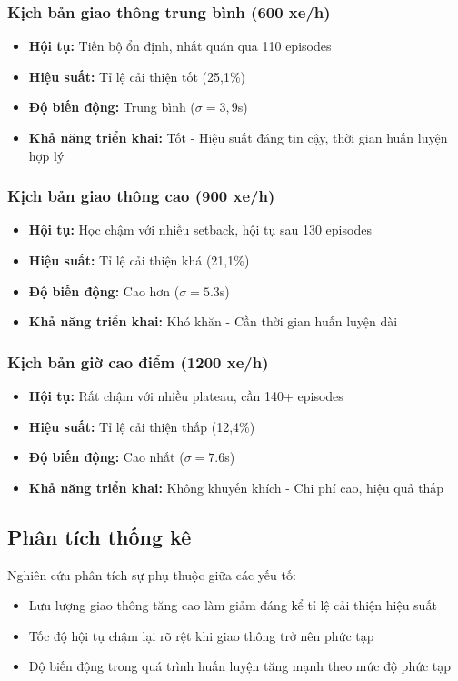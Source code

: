 \subsubsection{Kịch bản giao thông trung bình (600 xe/h)}
\begin{itemize}
    \item \textbf{Hội tụ:} Tiến bộ ổn định, nhất quán qua 110 episodes
    \item \textbf{Hiệu suất:} Tỉ lệ cải thiện tốt (25,1\%)
    \item \textbf{Độ biến động:} Trung bình ($\sigma = 3,9$s)
    \item \textbf{Khả năng triển khai:} Tốt - Hiệu suất đáng tin cậy, thời gian huấn luyện hợp lý
\end{itemize}

\subsubsection{Kịch bản giao thông cao (900 xe/h)}
\begin{itemize}
    \item \textbf{Hội tụ:} Học chậm với nhiều setback, hội tụ sau 130 episodes
    \item \textbf{Hiệu suất:} Tỉ lệ cải thiện khá (21,1\%)
    \item \textbf{Độ biến động:} Cao hơn ($\sigma = 5.3$s)
    \item \textbf{Khả năng triển khai:} Khó khăn - Cần thời gian huấn luyện dài
\end{itemize}

\subsubsection{Kịch bản giờ cao điểm (1200 xe/h)}
\begin{itemize}
    \item \textbf{Hội tụ:} Rất chậm với nhiều plateau, cần 140+ episodes
    \item \textbf{Hiệu suất:} Tỉ lệ cải thiện thấp (12,4\%)
    \item \textbf{Độ biến động:} Cao nhất ($\sigma = 7.6$s)
    \item \textbf{Khả năng triển khai:} Không khuyến khích - Chi phí cao, hiệu quả thấp
\end{itemize}

\subsection{Phân tích thống kê}
Nghiên cứu phân tích sự phụ thuộc giữa các yếu tố:
\begin{itemize}
    \item Lưu lượng giao thông tăng cao làm giảm đáng kể tỉ lệ cải thiện hiệu suất
    \item Tốc độ hội tụ chậm lại rõ rệt khi giao thông trở nên phức tạp
    \item Độ biến động trong quá trình huấn luyện tăng mạnh theo mức độ phức tạp
\end{itemize}

